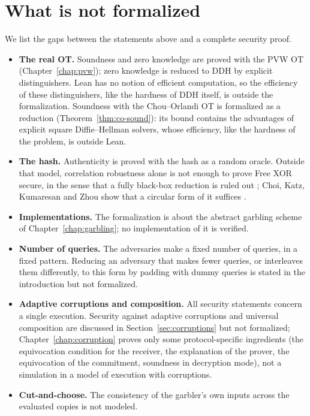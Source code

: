 \chapter{What is not formalized}
\label{chap:limitations}

We list the gaps between the statements above and a complete security proof.

\begin{itemize}
  \item \textbf{The real OT.} Soundness and zero knowledge are proved with the PVW OT
  (Chapter~\ref{chap:pvw}); zero knowledge is reduced to DDH by explicit distinguishers. Lean has
  no notion of efficient computation, so the efficiency of these distinguishers, like the hardness
  of DDH itself, is outside the formalization. Soundness with the Chou--Orlandi OT is formalized
  as a reduction (Theorem~\ref{thm:co-sound}): its bound contains the advantages of explicit square
  Diffie--Hellman solvers, whose efficiency, like the hardness of the problem, is outside Lean.
  \item \textbf{The hash.} Authenticity is proved with the hash as a random oracle. Outside that model,
  correlation robustness alone is not enough to prove Free XOR secure, in the sense that a fully
  black-box reduction is ruled out \cite[Sect.~3]{CKKZ12}; Choi,
  Katz, Kumaresan and Zhou show that a circular form of it suffices \cite[Sect.~4, Definition~4 and
  Theorem~1]{CKKZ12}.
  \item \textbf{Implementations.} The formalization is about the abstract garbling scheme of
  Chapter~\ref{chap:garbling}; no implementation of it is verified.
  \item \textbf{Number of queries.} The adversaries make a fixed number of queries, in a fixed
  pattern. Reducing an adversary that makes fewer queries, or interleaves them differently, to this
  form by padding with dummy queries is stated in the introduction but not formalized.
  \item \textbf{Adaptive corruptions and composition.} All security statements concern a single
  execution. Security against adaptive corruptions and universal composition are discussed in
  Section~\ref{sec:corruptions} but not formalized; Chapter~\ref{chap:corruption} proves only some
  protocol-specific ingredients (the equivocation condition for the receiver, the explanation of the prover, the
  equivocation of the commitment, soundness in decryption mode), not a simulation in a model of
  execution with corruptions.
  \item \textbf{Cut-and-choose.} The consistency of the garbler's own inputs across the evaluated
  copies is not modeled.
\end{itemize}

